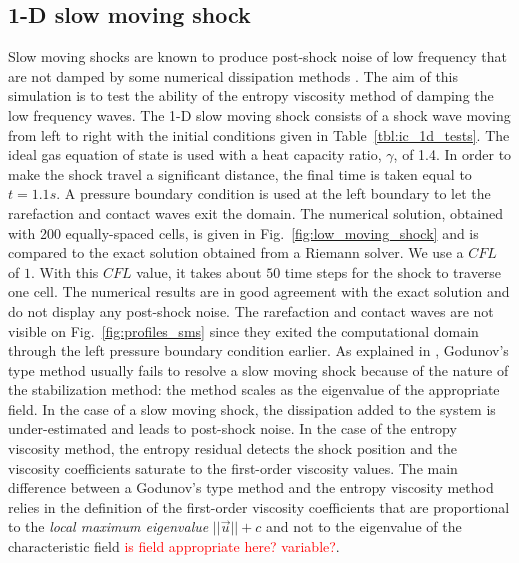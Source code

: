 \documentclass[preprint,10pt]{elsarticle}
\newcommand{\fig}[1]{Fig.~\ref{#1}}                      %
\newcommand{\tbl}[1]{Table~\ref{#1}}                     %
\newcommand{\tcr}[1]{\textcolor{red}{#1}}
\begin{document}
\subsection{1-D slow moving shock} \label{sec:slow_moving_shock}

Slow moving shocks are known to produce post-shock noise of low frequency that are not damped by some numerical dissipation methods \cite{james}. The aim of this simulation is to test the ability of the entropy viscosity method of damping the low frequency waves.
The 1-D slow moving shock consists of a shock wave moving from left to right with the initial conditions given in \tbl{tbl:ic_1d_tests}. The ideal gas equation of state is used with a heat capacity ratio, $\gamma$, of 1.4.  In order to make the shock travel a significant distance, the final time is taken equal to $t=1.1s$. A pressure boundary condition is used at the left boundary to let the rarefaction and contact waves exit the domain.   
%
The numerical solution, obtained with 200 equally-spaced cells, is given in \fig{fig:low_moving_shock} and is compared to the exact solution obtained from a Riemann solver. We use a $CFL$ of $1$. With this $CFL$ value, it takes about $50$ time steps for the shock to traverse one cell.
%
The numerical results are in good agreement with the exact solution and do not display any post-shock noise. The rarefaction and contact waves are not visible on \fig{fig:profiles_sms} since they exited the computational domain through the left pressure boundary condition earlier. As explained in \cite{roberts}, Godunov's type method usually fails to resolve a slow moving shock because of the nature of the stabilization method: the method scales as the eigenvalue of the appropriate field. In the case of a slow moving shock, the dissipation added to the system is under-estimated and leads to post-shock noise. In the case of the entropy viscosity method, the entropy residual detects the shock position and the viscosity coefficients saturate to the first-order viscosity values. The main difference between a  Godunov's type method and the entropy viscosity method relies in the definition of the first-order viscosity coefficients that are proportional to the \emph{local maximum eigenvalue} $||\vec{u}||+c$ and not to the eigenvalue of the characteristic field \tcr{is field appropriate here? variable?}.
%
\end{document}
